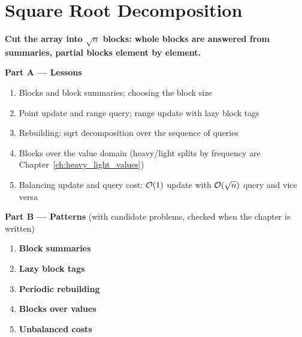 \chapter{Square Root Decomposition}
\label{ch:sqrt}

\begin{tcolorbox}[enhanced, colback=white, colframe=secondaryblue, boxrule=1pt, arc=2mm]
\textbf{\large\textcolor{primaryblue}{Cut the array into $\sqrt{n}$ blocks: whole blocks are answered from summaries, partial blocks element by element.}}
\end{tcolorbox}


\begin{plannedbox}
\textbf{Part A --- Lessons}
\begin{enumerate}[leftmargin=*, label=\textbf{A\arabic*.}, itemsep=1pt]
    \item Blocks and block summaries; choosing the block size
    \item Point update and range query; range update with lazy block tags
    \item Rebuilding: sqrt decomposition over the sequence of queries
    \item Blocks over the value domain (heavy/light splits by frequency are Chapter~\ref{ch:heavy_light_values})
    \item Balancing update and query cost: $\mathcal{O}(1)$ update with $\mathcal{O}(\sqrt n)$ query and vice versa
\end{enumerate}
\textbf{Part B --- Patterns} (with candidate problems, checked when the chapter is written)
\begin{enumerate}[leftmargin=*, label=\textbf{P\arabic*.}, itemsep=1pt]
    \item \textbf{Block summaries}
    \item \textbf{Lazy block tags}
    \item \textbf{Periodic rebuilding}
    \item \textbf{Blocks over values}
    \item \textbf{Unbalanced costs}
\end{enumerate}
\end{plannedbox}
